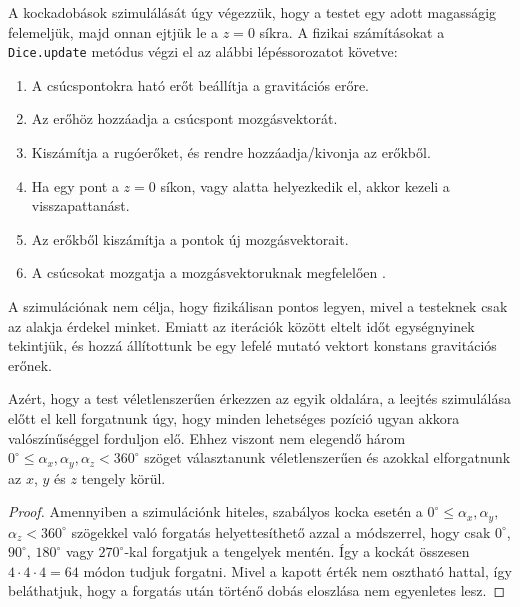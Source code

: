 
A kockadobások szimulálását úgy végezzük, hogy a testet egy adott magasságig felemeljük, majd onnan ejtjük le a $z=0$ síkra.
A fizikai számításokat a \texttt{Dice.update} metódus végzi el az alábbi lépéssorozatot követve:
\begin{enumerate}
	\item A csúcspontokra ható erőt beállítja a gravitációs erőre.
	\item Az erőhöz hozzáadja a csúcspont mozgásvektorát.
	\item Kiszámítja a rugóerőket, és rendre hozzáadja/kivonja az erőkből.
	\item Ha egy pont a $z=0$ síkon, vagy alatta helyezkedik el, akkor kezeli a visszapattanást.
	\item Az erőkből kiszámítja a pontok új mozgásvektorait.
	\item A csúcsokat mozgatja a mozgásvektoruknak megfelelően .
\end{enumerate}
A szimulációnak nem célja, hogy fizikálisan pontos legyen, mivel a testeknek csak az alakja érdekel minket.
Emiatt az iterációk között eltelt időt egységnyinek tekintjük, és hozzá állítottunk be egy lefelé mutató vektort konstans gravitációs erőnek.

\label{subs:randompoint}

Azért, hogy a test véletlenszerűen érkezzen az egyik oldalára, a leejtés szimulálása előtt el kell forgatnunk úgy, hogy minden lehetséges pozíció ugyan akkora valószínűséggel forduljon elő.
Ehhez viszont nem elegendő három $0^\circ \leq \alpha_x,\alpha_y,\alpha_z <360^\circ$ szöget választanunk véletlenszerűen és azokkal elforgatnunk az $x$, $y$ és $z$ tengely körül.
\begin{proof}
Amennyiben a szimulációnk hiteles, szabályos kocka esetén a $0^\circ \leq \alpha_x,\alpha_y,$ $\alpha_z <360^\circ$ szögekkel való forgatás helyettesíthető azzal a módszerrel, hogy csak $0^\circ$, $90^\circ$, $180^\circ$ vagy $270^\circ$-kal forgatjuk a tengelyek mentén. Így a kockát összesen $4\cdot 4\cdot 4 = 64$ módon tudjuk forgatni. Mivel a kapott érték nem osztható hattal, így beláthatjuk, hogy a forgatás után történő dobás eloszlása nem egyenletes lesz. 
\end{proof}


